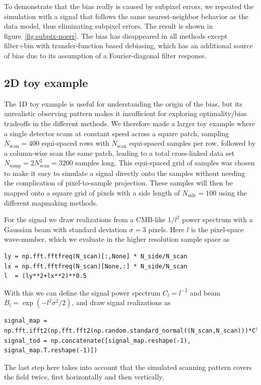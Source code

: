 \documentclass[twocolumn,apj]{aastex63}
\begin{document}
To demonstrate that the bias really is caused by subpixel errors,
we repeated the simulation with a signal that follows the same nearest-neighbor
behavior as the data model, thus eliminating subpixel errors. The
result is shown in figure~\ref{fig:subpix-noerr}. The bias has disappeared
in all methods except filter+bin with transfer-function based debiasing,
which has an additional source of bias due to its assumption of a Fourier-diagonal
filter response.

\subsection{2D toy example}
\label{sec:toy-2d}
The 1D toy example is useful for understanding the origin of the bias, but
its unrealistic observing pattern makes it insufficient for exploring
optimality/bias tradeoffs in the different methods. We therefore made a larger
toy example where a single detector scans at constant speed across a square
patch, sampling $N_\text{scan} = 400$ equi-spaced rows with $N_\text{scan}$
equi-spaced samples per row, followed by a column-wise scan the same patch,
leading to a total cross-linked data set $N_\text{samp} = 2 N_\text{scan}^2 = 3200$
samples long. This equi-spaced grid of samples was chosen to make it easy to
simulate a signal directly onto the samples without needing the complication
of pixel-to-sample projection. These samples will then be mapped onto a
square grid of pixels with a side length of $N_\text{side} = 100$ using
the different mapmaking methods.

For the signal we draw realizations from a CMB-like $1/l^2$ power spectrum
with a Gaussian beam with standard deviation $\sigma=3$ pixels. Here $l$
is the pixel-space wave-number, which we evaluate in the higher
resolution sample space as
\begin{lstlisting}
ly = np.fft.fftfreq(N_scan)[:,None] * N_side/N_scan
lx = np.fft.fftfreq(N_scan)[None,:] * N_side/N_scan
l  = (ly**2+lx**2)**0.5
\end{lstlisting}
With this we can define the signal power spectrum $C_l = l^{-2}$ and beam $B_l = \exp(-l^2 \sigma^2/2)$,
and draw signal realizations as
\begin{lstlisting}
signal_map = np.fft.ifft2(np.fft.fft2(np.random.standard_normal((N_scan,N_scan)))*Cl**0.5*Bl).real
signal_tod = np.concatenate([signal_map.reshape(-1), signal_map.T.reshape(-1)])
\end{lstlisting}
The last step here takes into account that the simulated scanning pattern covers the
field twice, first horizontally and then vertically.
\end{document}
